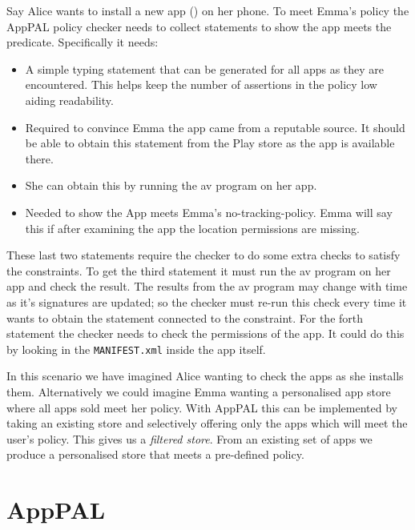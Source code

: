 \documentclass[]{scrartcl}
\begin{document}
Say Alice wants to install a new app () on her phone.
To meet Emma's policy the AppPAL policy checker needs to collect statements to show the app meets the  predicate.
Specifically it needs:
\begin{itemize}
  \item{}
    A simple typing statement that can be generated for all apps as they are encountered.
    This helps keep the number of  assertions in the policy low aiding readability.
  \item{}
    Required to convince Emma the app came from a reputable source.
    It should be able to obtain this statement from the Play store as the app is available there.
  \item{}
    She can obtain this by running the \ac{av} program on her app.
  \item{}
    Needed to show the App meets Emma's no-tracking-policy.
    Emma will say this if after examining the app the location permissions are missing.
\end{itemize}
These last two statements require the checker to do some extra checks to satisfy the constraints.
To get the third statement it must run the \ac{av} program on her app and check the result.
The results from the \ac{av} program may change with time as it's signatures are updated;
  so the checker must re-run this check every time it wants to obtain the statement connected to the constraint.
For the forth statement the checker needs to check the permissions of the app.
It could do this by looking in the \texttt{MANIFEST.xml} inside the app itself.

In this scenario we have imagined Alice wanting to check the apps as she installs them.
Alternatively we could imagine Emma wanting a personalised app store where all apps sold meet her policy.
With AppPAL this can be implemented by taking an existing store and selectively offering only the apps which will meet the user's policy.
This gives us a \emph{filtered store}.
From an existing set of apps we produce a personalised store that meets a pre-defined policy.

\section{AppPAL}
\label{sec:details}
\end{document}
